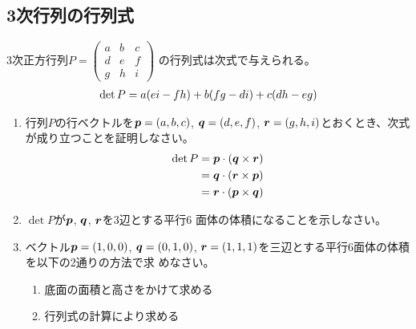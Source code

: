 \documentclass[twocolumn,11pt]{jarticle}
\begin{document}
\subsection{3次行列の行列式}

3次正方行列$P=
  \begin{pmatrix}
    a & b & c\\
    d & e & f\\
    g & h & i
  \end{pmatrix}
$
の行列式は次式で与えられる。
\begin{align}
  \det P=a(ei-fh)+b(fg-di)+c(dh-eg)\notag
\end{align}
\begin{enumerate}
\item 行列$P$の行ベクトルを$\boldsymbol{p}=(a,b,c)$, $\boldsymbol{q}=(d,e,f)$,
  $\boldsymbol{r}=(g,h,i)$とおくとき、次式が成り立つことを証明しなさい。
  \begin{align}
    \det P&=\boldsymbol{p}\cdot(\boldsymbol{q}\times\boldsymbol{r})\notag\\
    &=\boldsymbol{q}\cdot(\boldsymbol{r}\times\boldsymbol{p})\notag\\
    &=\boldsymbol{r}\cdot(\boldsymbol{p}\times\boldsymbol{q})\notag
  \end{align}
\item  $\det P$が$\boldsymbol{p}$, $\boldsymbol{q}$, $\boldsymbol{r}$を3辺とする平行6
  面体の体積になることを示しなさい。
\item ベクトル$\boldsymbol{p}=(1,0,0)$, $\boldsymbol{q}=(0,1,0)$,
  $\boldsymbol{r}=(1,1,1)$を三辺とする平行6面体の体積を以下の2通りの方法で求
  めなさい。
  \begin{enumerate}
  \item 底面の面積と高さをかけて求める
  \item 行列式の計算により求める
  \end{enumerate}
\end{enumerate}%
\end{document}
